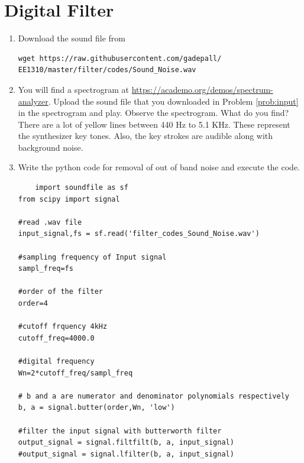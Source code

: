 \documentclass[journal,12pt,twocolumn]{IEEEtran}
\renewcommand\thesection{\arabic{section}}
\begin{document}
\section{Digital Filter}
\begin{enumerate}[label=\thesection.\arabic*
,ref=\thesection.\theenumi]
\item
\label{prob:input}
Download the sound file from  
\begin{lstlisting}
wget https://raw.githubusercontent.com/gadepall/ 
EE1310/master/filter/codes/Sound_Noise.wav
\end{lstlisting}
\item
\label{prob:spectrogram}
You will find a spectrogram at \href{https://academo.org/demos/spectrum-analyzer}{\url{https://academo.org/demos/spectrum-analyzer}}. 
%
Upload the sound file that you downloaded in Problem \ref{prob:input} in the spectrogram  and play.  Observe the spectrogram. What do you find?
\\
%
\solution There are a lot of yellow lines between 440 Hz to 5.1 KHz.  These represent the synthesizer key tones. Also, the key strokes
are audible along with background noise.
\item
\label{prob:output}
Write the python code for removal of out of band noise and execute the code.
\\
\solution
\begin{lstlisting}
    import soundfile as sf
from scipy import signal

#read .wav file 
input_signal,fs = sf.read('filter_codes_Sound_Noise.wav') 

#sampling frequency of Input signal
sampl_freq=fs

#order of the filter
order=4   

#cutoff frquency 4kHz
cutoff_freq=4000.0  

#digital frequency
Wn=2*cutoff_freq/sampl_freq  

# b and a are numerator and denominator polynomials respectively
b, a = signal.butter(order,Wn, 'low') 

#filter the input signal with butterworth filter
output_signal = signal.filtfilt(b, a, input_signal)
#output_signal = signal.lfilter(b, a, input_signal)


\end{lstlisting}
\end{enumerate}
\end{document}
